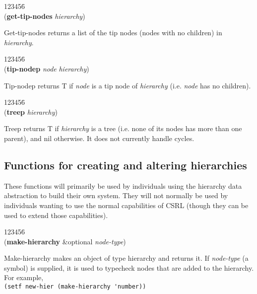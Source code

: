 \begin{tabbing}
123456\= \kill
\\
({\bf get-tip-nodes} {\it hierarchy\/}) 
\end{tabbing}
Get-tip-nodes returns a list of the tip nodes (nodes with no children)
in {\it hierarchy\/}.

\begin{tabbing}
123456\= \kill
\\
({\bf tip-nodep} {\it node} {\it hierarchy\/}) 
\end{tabbing}
Tip-nodep returns T if {\it node} is a tip node of {\it hierarchy}
(i.e. {\it node} has no children).


\begin{tabbing}
123456\= \kill
\\
({\bf treep} {\it hierarchy\/}) 
\end{tabbing}
Treep returns T if {\it hierarchy} is a tree (i.e. none of its nodes
has more than one parent), and nil otherwise. It does not currently
handle cycles.


\subsection{Functions for creating and altering hierarchies}

These functions will primarily be used by individuals using the
hierarchy data abstraction to build their own system. They will not
normally be used by individuals wanting to use the normal capabilities
of CSRL (though they can be used to extend those capabilities).


\begin{tabbing}
123456\= \kill
\\
({\bf make-hierarchy} \&optional {\it node-type\/}) 
\end{tabbing}
Make-hierarchy makes an object of type hierarchy and returns it. If
{\it node-type} (a symbol) is supplied, it is used to typecheck nodes
that are added to the hierarchy. For example,
\\[8pt]
\verb$(setf new-hier (make-hierarchy 'number))$


